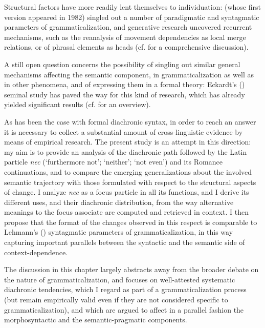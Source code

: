 \documentclass[output=paper]{langsci/langscibook}
\begin{document}
Structural factors have more readily lent themselves to individuation: \citet[]{Lehmann15} (whose first version appeared in 1982) singled out a number of paradigmatic and syntagmatic parameters of grammaticalization, and generative research uncovered recurrent mechanisms, such as the reanalysis of movement dependencies as local merge relations, or of phrasal elements as heads (cf. \citealt[]{RobertsRoussou03, Gelderen04a} for a comprehensive discussion).

A still open question concerns the possibility of singling out similar general mechanisms affecting the semantic component, in grammaticalization as well as in other phenomena, and of expressing them in a formal theory: Eckardt's (\citeyear{Eckardt2006}) seminal study has paved the way for this kind of research, which has already yielded significant results (cf. \citealt[]{Eckardt12, Deo15, Gianolloetal15} for an overview).

As has been the case with formal diachronic syntax, in order to reach an answer it is necessary to collect a substantial amount of cross-linguistic evidence by means of empirical research. The present study is an attempt in this direction: my aim is to provide an analysis of the diachronic path followed by the Latin particle {\emph{nec}} (`furthermore not'; `neither'; `not even') and its Romance continuations, and to compare the emerging generalizations about the involved semantic trajectory with those formulated with respect to the structural aspects of change. I analyze {\emph{nec}} as a focus particle in all its functions, and I derive its different uses, and their diachronic distribution, from the way alternative meanings to the focus associate are computed and retrieved in context. I then propose that the format of the changes observed in this respect is comparable to Lehmann's (\citeyear[]{Lehmann15}) syntagmatic parameters of grammaticalization, in this way capturing important parallels between the syntactic and the semantic side of context-dependence.

The discussion in this chapter largely abstracts away from the broader debate on the nature of grammaticalization, and focuses on well-attested systematic diachronic tendencies, which I regard as part of a grammaticalization process (but remain empirically valid even if they are not considered specific to grammaticalization), and which are argued to affect in a parallel fashion the morphosyntactic and the semantic-pragmatic components.
\end{document}
